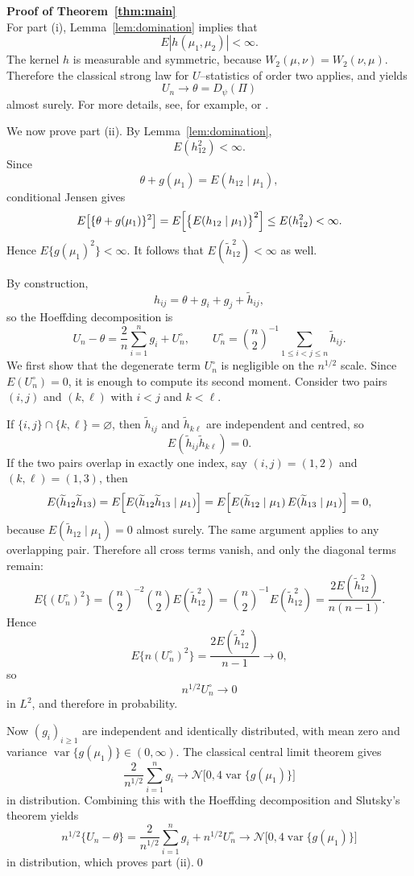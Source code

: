 \documentclass[10pt]{article}
\newcommand{\W}{W_2}
\begin{document}
\vspace{1cm}
\noindent \textbf{Proof of Theorem~\ref{thm:main}}\\
For part (i), Lemma~\ref{lem:domination} implies that
\[
E|h(\mu_1,\mu_2)|<\infty.
\]
The kernel $h$ is measurable and symmetric, because $\W(\mu,\nu)=\W(\nu,\mu)$. Therefore the classical strong law for $U$--statistics of order two applies, and yields
\[
U_n\to \theta=D_{\psi}(\Pi)
\]
almost surely. For more details, see,  for example, \citet{hoeffding_1948_ClassStatisticsAsymptotically} or \citet{serfling_1980_ApproximationTheoremsMathematical}.

We now prove part (ii). By Lemma~\ref{lem:domination},
\[
E(h_{12}^2)<\infty.
\]
Since
\[
\theta+g(\mu_1)=E(h_{12}\mid \mu_1),
\]
conditional Jensen gives
\[
E\bigl[\{\theta+g(\mu_1)\}^2\bigr]
=
E\Bigl[\bigl\{E(h_{12}\mid \mu_1)\bigr\}^2\Bigr]
\leq
E(h_{12}^2)
<\infty.
\]
Hence $E\{g(\mu_1)^2\}<\infty$. It follows that $E(\widetilde h_{12}^2)<\infty$ as well.

By construction,
\[
h_{ij}=\theta+g_i+g_j+\widetilde h_{ij},
\]
so the Hoeffding decomposition is
\[
U_n-\theta
=
\frac{2}{n}\sum_{i=1}^n g_i
+
U_n^{\circ},
\qquad
U_n^{\circ}
=
\binom{n}{2}^{-1}\sum_{1\leq i<j\leq n}\widetilde h_{ij}.
\]
We first show that the degenerate term $U_n^{\circ}$ is negligible on the $n^{1/2}$ scale. Since $E(U_n^{\circ})=0$, it is enough to compute its second moment. Consider two pairs $(i,j)$ and $(k,\ell)$ with $i<j$ and $k<\ell$.

If $\{i,j\}\cap\{k,\ell\}=\varnothing$, then $\widetilde h_{ij}$ and $\widetilde h_{k\ell}$ are independent and centred, so
\[
E(\widetilde h_{ij}\widetilde h_{k\ell})=0.
\]
If the two pairs overlap in exactly one index, say $(i,j)=(1,2)$ and $(k,\ell)=(1,3)$, then
\[
E(\widetilde h_{12}\widetilde h_{13})
=
E\Bigl[E(\widetilde h_{12}\widetilde h_{13}\mid \mu_1)\Bigr]
=
E\Bigl[E(\widetilde h_{12}\mid \mu_1)\,E(\widetilde h_{13}\mid \mu_1)\Bigr]
=
0,
\]
because $E(\widetilde h_{12}\mid \mu_1)=0$ almost surely. The same argument applies to any overlapping pair. Therefore all cross terms vanish, and only the diagonal terms remain:
\[
E\bigl\{(U_n^{\circ})^2\bigr\}
=
\binom{n}{2}^{-2}
\binom{n}{2}
E(\widetilde h_{12}^2)
=
\binom{n}{2}^{-1}E(\widetilde h_{12}^2)
=
\frac{2E(\widetilde h_{12}^2)}{n(n-1)}.
\]
Hence
\[
E\bigl\{n(U_n^{\circ})^2\bigr\}
=
\frac{2E(\widetilde h_{12}^2)}{n-1}\to 0,
\]
so
\[
n^{1/2}U_n^{\circ}\to 0
\]
in $L^2$, and therefore in probability.

Now $(g_i)_{i\geq 1}$ are independent and identically distributed, with mean zero and variance $\operatorname{var}\{g(\mu_1)\}\in(0,\infty)$. The classical central limit theorem gives
\[
\frac{2}{n^{1/2}}\sum_{i=1}^n g_i
\to
\mathcal{N}\bigl[0,4\operatorname{var}\{g(\mu_1)\}\bigr]
\]
in distribution. Combining this with the Hoeffding decomposition and Slutsky's theorem yields
\[
n^{1/2}\{U_n-\theta\}
=
\frac{2}{n^{1/2}}\sum_{i=1}^n g_i
+
n^{1/2}U_n^{\circ}
\to
\mathcal{N}\bigl[0,4\operatorname{var}\{g(\mu_1)\}\bigr]
\]
in distribution, which proves part (ii).\qed
\end{document}
